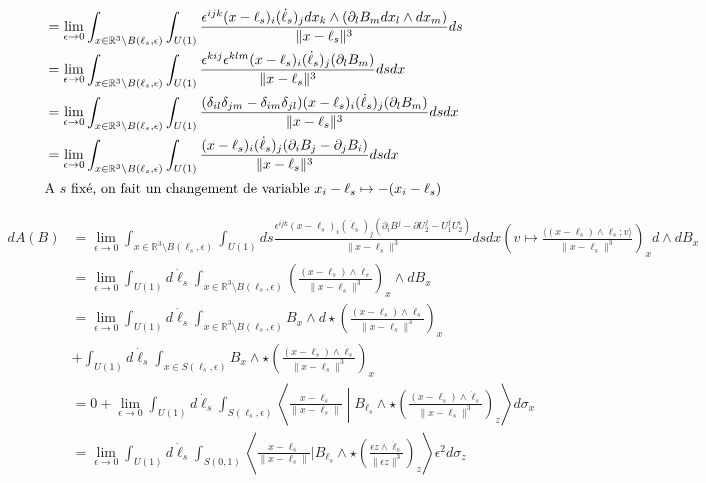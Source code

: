 \documentclass[10pt]{article}
\begin{document}
  \newpage
  \begin{align*}
  &=\lim_{\epsilon\to 0}\int_{x\in\mathbb{R}^3\setminus B(\ell_s,\epsilon)} \int_{U(1)} \frac{\epsilon^{ijk}(x-\ell_s)_i(\dot\ell_s)_j dx_k\wedge ( \partial_lB_m dx_l\wedge dx_m )}{\|x-\ell_s\|^3} ds \\
  &=\lim_{\epsilon\to 0}\int_{x\in\mathbb{R}^3\setminus B(\ell_s,\epsilon)} \int_{U(1)} \frac{\epsilon^{kij}\epsilon^{klm}(x-\ell_s)_i(\dot\ell_s)_j( \partial_lB_m )}{\|x-\ell_s\|^3} ds dx \\
  &=\lim_{\epsilon\to 0}\int_{x\in\mathbb{R}^3\setminus B(\ell_s,\epsilon)} \int_{U(1)} \frac{(\delta_{il}\delta_{jm}-\delta_{im}\delta_{jl})(x-\ell_s)_i(\dot\ell_s)_j( \partial_lB_m )}{\|x-\ell_s\|^3} ds dx \\
  &=\lim_{\epsilon\to 0}\int_{x\in\mathbb{R}^3\setminus B(\ell_s,\epsilon)} \int_{U(1)} \frac{(x-\ell_s)_i(\dot\ell_s)_j( \partial_iB_j-\partial_jB_i  )}{\|x-\ell_s\|^3} ds dx \\
  \intertext{A $s$ fixé, on fait un changement de variable $x_i-\ell_s\mapsto -(x_i-\ell_s)$}
\end{align*}




\begin{align*}
dA(B)&=\lim_{\epsilon\to 0} \int_{x\in\mathbb{R}^3\setminus B(\ell_s,\epsilon)}  \int_{U(1)} ds  \frac{\epsilon^{ijk}(x-\ell_s)_i(\dot\ell_s)_j(\partial_i B^j- \partial U_2^j-U_1^j U_2^i)}{\|x-\ell_s\|^3} ds dx
 \left(v\mapsto \frac{\langle(x-\ell_s)\wedge \dot{\ell}_s;v\rangle}{\|x-\ell_s\|^3}\right)_xd \wedge d B_x \\
&=\lim_{\epsilon\to 0} \int_{U(1)} d\dot{\ell}_s \int_{x\in\mathbb{R}^3\setminus B(\ell_s,\epsilon)}   \left( \frac{(x-\ell_s)\wedge \dot{\ell}_s}{\|x-\ell_s\|^3}\right)_x \wedge dB_x \\
&=\lim_{\epsilon\to 0} \int_{U(1)} d\dot{\ell}_s \int_{x\in \mathbb{R}^3\setminus B(\ell_s,\epsilon)}  B_x\wedge d\star\left( \frac{(x-\ell_s)\wedge \dot{\ell}_s}{\|x-\ell_s\|^3}\right)_x
\\&+\int_{U(1)} d\dot{\ell}_s \int_{x\in S(\ell_s,\epsilon)} B_x\wedge \star\left(\frac{(x-\ell_s)\wedge\dot{\ell}_s}{\|x-\ell_s\|^3}\right)_x \\
&=0+\lim_{\epsilon\to 0} \int_{U(1)} d\dot{\ell}_s \int_{S(\ell_s,\epsilon)} \left\langle \frac{x-\ell_s}{\|x-\ell_s\|}\middle| B_{\ell_s} \wedge \star\left(\frac{(x-\ell_s )\wedge\dot{\ell}_s}{\|x-\ell_s\|^3}\right)_z\right\rangle d\sigma_x \\
&=\lim_{\epsilon\to 0} \int_{U(1)} d\dot{\ell}_s \int_{S(0,1)} \left\langle \frac{x-\ell_s}{\|x-\ell_s\|}| B_{\ell_s} \wedge \star\left(\frac{\epsilon z \wedge\dot{\ell}_s}{\|\epsilon z\|^3}\right)_z\right\rangle \epsilon^2 d\sigma_z \\
\end{align*}
\end{document}
